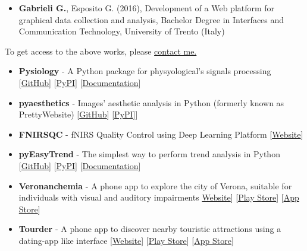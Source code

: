 \documentclass[10pt,a4paper]{altacv}
\begin{document}
\begin{fullwidth}
\begin{itemize}
			\item \textbf{Gabrieli G.}, Esposito G. (2016), Development of a Web platform for graphical data collection and analysis, Bachelor Degree in Interfaces and Communication Technology, University of Trento (Italy) 
		\end{itemize}
		
		To get access to the above works, please \href{mailto:gack94@gmail.com}{contact me.}
		
		\begin{itemize}
			\item \textbf{Pysiology} - A Python package for physyological's signals processing  [\href{https://github.com/Gabrock94/Pysiology}{GitHub}] [\href{https://pypi.org/project/pysiology/}{PyPI}] [\href{https://pysiology.rtfd.io}{Documentation}] 
			
			\item \textbf{pyaesthetics} -  Images' aesthetic analysis in Python (formerly known as PrettyWebsite)  [\href{https://github.com/Gabrock94/pyaesthetics}{GitHub}] [\href{https://pypi.org/project/pyaesthetics/}{PyPI}]] 
			
			\item \textbf{FNIRSQC} -  fNIRS Quality Control using Deep Learning Platform  [\href{https://socialaffectiveneuroscience.com/fnirsqc/}{Website}]
			
			\item \textbf{pyEasyTrend} - The simplest way to perform trend analysis in Python [\href{https://github.com/Gabrock94/pyEasyTrend}{GitHub}] [\href{https://pypi.org/project/pyEasyTrend/}{PyPI}] [\href{https://pyeasytrend.readthedocs.io}{Documentation}] 
			
			
			\item \textbf{Veronanchemia} - A  phone app to explore the city of Verona, suitable for individuals with visual and auditory impairments \href{https://www.veronanchemia.it/}{Website}] [\href{https://play.google.com/store/apps/details?id=com.giuliogabrieli.verona_anche_mia}{Play Store}] [\href{https://apps.apple.com/app/id1645680408}{App Store}] 
			
			\item \textbf{Tourder} - A  phone app to discover nearby touristic attractions using a dating-app like interface [\href{https://tourder.app/}{Website}] [\href{https://play.google.com/store/apps/details?id=com.giuliogabrieli.tourder}{Play Store}] [\href{https://apps.apple.com/app/tourder/id6471831650}{App Store}] 
		\end{itemize}
		

\end{fullwidth}
\end{document}
